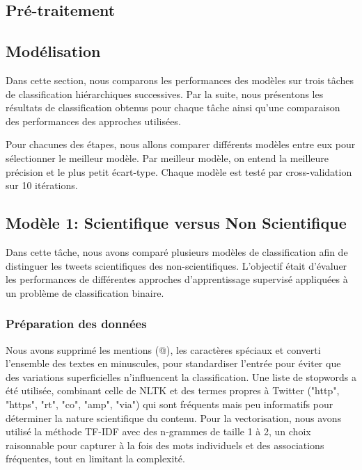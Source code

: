 \usepackage{hyperref}\subsection{Pré-traitement}\label{subsec:pre-traitement}


\subsection{Modélisation}\label{subsec:modelisation}
Dans cette section, nous comparons les performances des modèles sur trois tâches de classification hiérarchiques successives.
Par la suite, nous présentons les résultats de classification obtenus pour chaque tâche ainsi qu’une comparaison des performances des approches utilisées.

\noindent Pour chacunes des étapes, nous allons comparer différents modèles entre eux pour sélectionner le meilleur modèle.
Par meilleur modèle, on entend la meilleure précision et le plus petit écart-type.
Chaque modèle est testé par cross-validation sur 10 itérations.

\subsection{Modèle 1: Scientifique versus Non Scientifique}\label{subsec:modele-1:-sci-vs-non-sci}
Dans cette tâche, nous avons comparé plusieurs modèles de classification afin de distinguer les tweets scientifiques des non-scientifiques.
L’objectif était d’évaluer les performances de différentes approches d’apprentissage supervisé appliquées à un problème de classification binaire.

\subsubsection{Préparation des données}
Nous avons supprimé les mentions (@), les caractères spéciaux et converti l’ensemble des textes en minuscules, pour standardiser l’entrée pour éviter que des variations superficielles n’influencent la classification.
Une liste de stopwords a été utilisée, combinant celle de NLTK et des termes propres à Twitter ("http", "https", "rt", "co", "amp", "via") qui sont fréquents mais peu informatifs pour déterminer la nature scientifique du contenu.
Pour la vectorisation, nous avons utilisé la méthode TF-IDF avec des n-grammes de taille 1 à 2, un choix raisonnable pour capturer à la fois des mots individuels et des associations fréquentes, tout en limitant la complexité.

